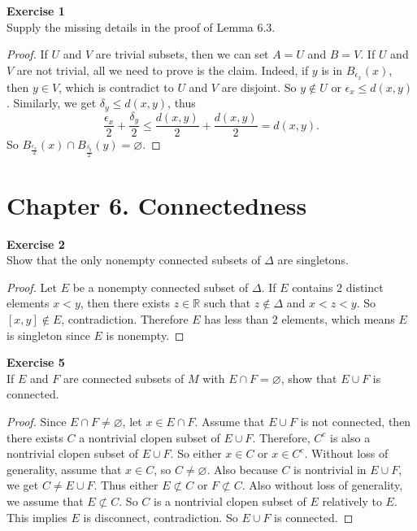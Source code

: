 \documentclass[12pt, a4paper]{article}
\theoremstyle{plain}
\newcommand{\R}{\mathbb{R}}
\newenvironment{exercise}[2][Exercise]
    { \begin{mdframed}[backgroundcolor=gray!20] \textbf{#1 #2} \\}
    {  \end{mdframed}}
\begin{document}
\begin{exercise}{1}
Supply the missing details in the proof of Lemma 6.3.
\end{exercise}
	\begin{proof}
	If $U$ and $V$ are trivial subsets, then we can set $A=U$ and $B=V$. If $U$ and $V$ are not trivial, all we need to prove is the claim. Indeed, if $y$ is in $B_{\epsilon_x}(x)$, then $y\in V$, which is contradict to $U$ and $V$ are disjoint. So $y\notin U$ or $\epsilon_x\leq d(x,y)$. Similarly, we get $\delta_y\leq d(x,y)$, thus
	\[
	\frac{\epsilon_x}{2}+\frac{\delta_y}{2}\leq \frac{d(x,y)}{2}+\frac{d(x,y)}{2}=d(x,y).
	\]
	So $B_\frac{\epsilon_x}{2}(x)\cap B_\frac{\delta_y}{2}(y)=\varnothing$.
	\end{proof}

\section*{Chapter 6. Connectedness}

\begin{exercise}{2}
Show that the only nonempty connected subsets of $\Delta$ are singletons.
\end{exercise}
	\begin{proof}
	Let $E$ be a nonempty connected subset of $\Delta$. If $E$ contains $2$ distinct elements $x<y$, then there exists $z\in\R$ such that $z\notin\Delta$ and $x<z<y$. So $[x,y]\notin E$, contradiction. Therefore $E$ has less than $2$ elements, which means $E$ is singleton since $E$ is nonempty.
	\end{proof}
	
\begin{exercise}{5}
If $E$ and $F$ are connected subsets of $M$ with $E\cap F=\varnothing$, show that $E\cup F$ is connected.
\end{exercise}
	\begin{proof}
	Since $E\cap F\neq\varnothing$, let $x\in E\cap F$. Assume that $E\cup F$ is not connected, then there exists $C$ a nontrivial clopen subset of $E\cup F$. Therefore, $C^c$ is also a nontrivial clopen subset of $E\cup F$. So either $x\in C$ or $x\in C^c$. Without loss of generality, assume that $x\in C$, so $C\neq \varnothing$. Also because $C$ is nontrivial in $E\cup F$, we get $C\neq E\cup F$. Thus either $E\not\subset C$ or $F\not\subset C$. Also without loss of generality, we assume that $E\not\subset C$. So $C$ is a nontrivial clopen subset of $E$ relatively to $E$. This implies $E$ is disconnect, contradiction. So $E\cup F$ is connected.
	\end{proof}
	
\end{document}
